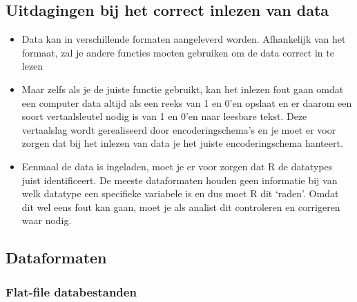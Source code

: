 \documentclass[]{tufte-book}
\providecommand{\tightlist}{%
  \setlength{\itemsep}{0pt}\setlength{\parskip}{0pt}}
\begin{document}
\hypertarget{uitdagingen-bij-het-correct-inlezen-van-data}{%
\subsection{Uitdagingen bij het correct inlezen van data}\label{uitdagingen-bij-het-correct-inlezen-van-data}}

\begin{itemize}
\tightlist
\item
  Data kan in verschillende formaten aangeleverd worden. Afhankelijk van het formaat, zal je andere functies moeten gebruiken om de data correct in te lezen
\item
  Maar zelfs als je de juiste functie gebruikt, kan het inlezen fout gaan omdat een computer data altijd als een reeks van 1 en 0'en opslaat en er daarom een soort vertaalsleutel nodig is van 1 en 0'en naar leesbare tekst. Deze vertaalslag wordt gerealiseerd door encoderingschema's en je moet er voor zorgen dat bij het inlezen van data je het juiste encoderingschema hanteert.
\item
  Eenmaal de data is ingeladen, moet je er voor zorgen dat R de datatypes juist identificeert. De meeste dataformaten houden geen informatie bij van welk datatype een specifieke variabele is en dus moet R dit `raden'. Omdat dit wel eens fout kan gaan, moet je als analist dit controleren en corrigeren waar nodig.
\end{itemize}

\hypertarget{dataformaten}{%
\subsection{Dataformaten}\label{dataformaten}}

\hypertarget{flat-file-databestanden}{%
\subsubsection{Flat-file databestanden}\label{flat-file-databestanden}}
\end{document}
